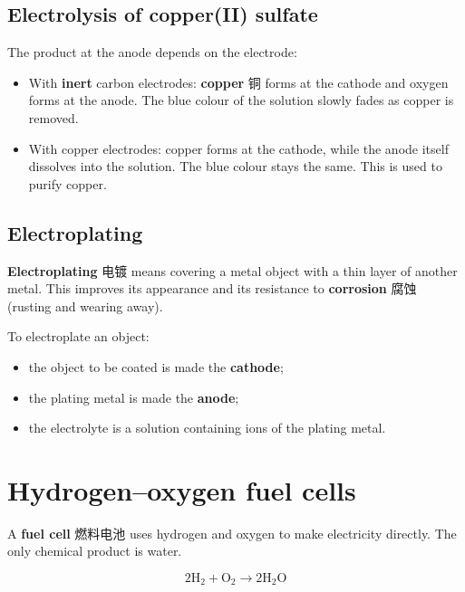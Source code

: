 \documentclass[11pt]{article}
\begin{document}
\subsection*{Electrolysis of copper(II) sulfate}

The product at the anode depends on the electrode:

\begin{itemize}
\item With \textbf{inert} carbon electrodes: \textbf{copper} 铜 forms at the cathode and oxygen forms at the anode. The blue colour of the solution slowly fades as copper is removed.

\item With copper electrodes: copper forms at the cathode, while the anode itself dissolves into the solution. The blue colour stays the same. This is used to purify copper.

\end{itemize}

\subsection*{Electroplating}

\textbf{Electroplating} 电镀 means covering a metal object with a thin layer of another metal. This improves its appearance and its resistance to \textbf{corrosion} 腐蚀 (rusting and wearing away).

To electroplate an object:

\begin{itemize}
\item the object to be coated is made the \textbf{cathode};

\item the plating metal is made the \textbf{anode};

\item the electrolyte is a solution containing ions of the plating metal.

\end{itemize}

\section*{Hydrogen–oxygen fuel cells}

A \textbf{fuel cell} 燃料电池 uses hydrogen and oxygen to make electricity directly. The only chemical product is water.

\[
2\text{H}_2 + \text{O}_2 \rightarrow 2\text{H}_2\text{O}
\]
\end{document}

